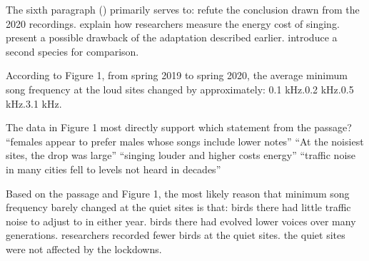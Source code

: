 \documentclass[11pt]{article}
\begin{document}
{The sixth paragraph () primarily serves to:}
{refute the conclusion drawn from the 2020 recordings.}
{explain how researchers measure the energy cost of singing.}
{present a possible drawback of the adaptation described earlier.}
{introduce a second species for comparison.}

{According to Figure 1, from spring 2019 to spring 2020, the average minimum song frequency at the loud sites changed by approximately:}
{0.1 kHz.}{0.2 kHz.}{0.5 kHz.}{3.1 kHz.}

{The data in Figure 1 most directly support which statement from the passage?}
{``females appear to prefer males whose songs include lower notes''}
{``At the noisiest sites, the drop was large''}
{``singing louder and higher costs energy''}
{``traffic noise in many cities fell to levels not heard in decades''}

{Based on the passage and Figure 1, the most likely reason that minimum song frequency barely changed at the quiet sites is that:}
{birds there had little traffic noise to adjust to in either year.}
{birds there had evolved lower voices over many generations.}
{researchers recorded fewer birds at the quiet sites.}
{the quiet sites were not affected by the lockdowns.}
\end{document}
